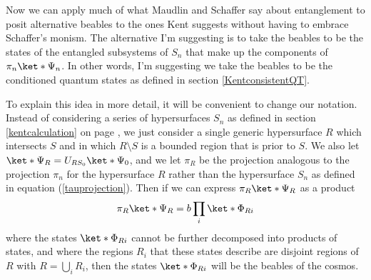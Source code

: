 \documentclass[12pt]{report}
\providecommand{\DIFaddbegin}{} %
\providecommand{\DIFaddend}{} %
\providecommand{\DIFdelbegin}{} %
\providecommand{\DIFdelend}{} %
\begin{document}
Now we can apply much of what Maudlin and Schaffer say about entanglement to posit alternative beables to the ones Kent suggests without having to embrace Schaffer's monism. The alternative I'm suggesting is to take  the beables to be the states of the entangled subsystems of $S_n$ that make up the components of $\pi_n\ket*{\Psi_n}$. In other words, I'm suggesting we take the beables to be the conditioned quantum states as defined in section \ref{KentconsistentQT}. 

To explain this idea in more detail, it will be convenient to change our notation. Instead of considering a series of hypersurfaces $S_n$ as defined in section \ref{kentcalculation} on page \pageref{siydef}, we just consider a single generic hypersurface $R$ %
\DIFdelbegin %
\DIFdelend \DIFaddbegin {}\DIFaddend %
which intersects $S$ and in which $R\setminus S$ is a bounded region that is prior to $S$. We also let $\ket*{\Psi_R}=U_{RS_0}\ket*{\Psi_0}$, %
\DIFdelbegin %
\DIFdelend \DIFaddbegin {}\DIFaddend %
and we let $\pi_R$ %
%
be the projection analogous to the projection  $\pi_n$ for the hypersurface $R$ rather than the hypersurface $S_n$ as defined in equation (\ref{tauprojection}). Then if we can express $\pi_R\ket*{\Psi_R}$ as a product 
\begin{equation}\label{beablesprod}
\pi_R\ket*{\Psi_R}=b\prod_i \ket*{\Phi_{Ri}}
\end{equation}%
\DIFdelbegin %
\DIFdelend \DIFaddbegin {}\DIFaddend %
where the states $\ket*{\Phi_{Ri}}$ cannot be further decomposed into products of states, and where the regions $R_{i}$ %
%
that these states describe are disjoint regions of $R$ with $R=\bigcup_i R_{i}$, then the states $\ket*{\Phi_{Ri}}$ will be the beables of the cosmos.
\end{document}
